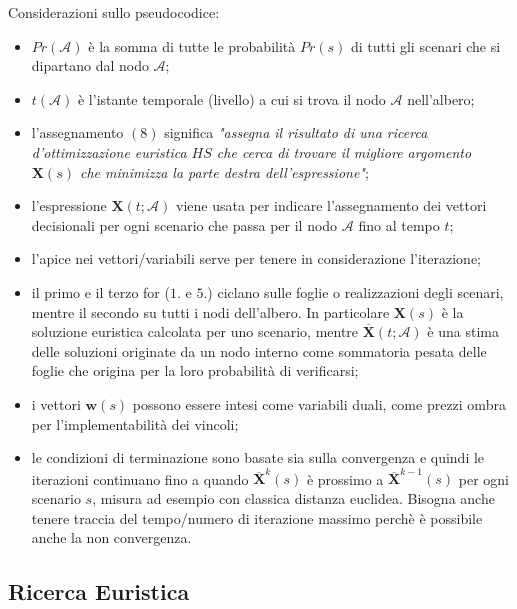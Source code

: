 \documentclass[
]{article}
\providecommand{\tightlist}{%
  \setlength{\itemsep}{0pt}\setlength{\parskip}{0pt}}
\begin{document}
Considerazioni sullo pseudocodice:
\begin{itemize}
\tightlist
\item
  {\(Pr(\mathcal{A})\)} è la somma di tutte le probabilità {\(Pr(s)\)}
  di tutti gli scenari che si dipartano dal nodo {\(\mathcal{A}\)};
\item
  {\(t(\mathcal{A})\)} è l'istante temporale (livello) a cui si trova il
  nodo {\(\mathcal{A}\)} nell'albero;
\item
  l'assegnamento {\((8)\)} significa \emph{"assegna il risultato di una
  ricerca d'ottimizzazione euristica {\(HS\)} che cerca di trovare il
  migliore argomento {\(\mathbf{X}(s)\)} che minimizza la parte destra
  dell'espressione"};
\item
  l'espressione {\(\mathbf{X}(t;\mathcal{A})\)} viene usata per indicare
  l'assegnamento dei vettori decisionali per ogni scenario che passa per
  il nodo {\(\mathcal{A}\)} fino al tempo {\(t\)};
\item
  l'apice nei vettori/variabili serve per tenere in considerazione
  l'iterazione;
\item
  il primo e il terzo for ({\(1.\)} e {\(5.\)}) ciclano sulle foglie o
  realizzazioni degli scenari, mentre il secondo su tutti i nodi
  dell'albero. In particolare {\(\mathbf{X}(s)\)} è la soluzione
  euristica calcolata per uno scenario, mentre
  {\(\overline{\mathbf{X}}(t;\mathcal{A})\)} è una stima delle soluzioni
  originate da un nodo interno come sommatoria pesata delle foglie che
  origina per la loro probabilità di verificarsi;
\item
  i vettori {\(\mathbf{w}(s)\)} possono essere intesi come variabili
  duali, come prezzi ombra per l'implementabilità dei vincoli;
\item
  le condizioni di terminazione sono basate sia sulla convergenza e
  quindi le iterazioni continuano fino a quando
  {\({\overline{\mathbf{X}}}^{k}(s)\)} è prossimo a
  {\({\overline{\mathbf{X}}}^{k - 1}(s)\)} per ogni scenario {\(s\)},
  misura ad esempio con classica distanza euclidea. Bisogna anche tenere
  traccia del tempo/numero di iterazione massimo perchè è possibile
  anche la non convergenza.
\end{itemize}

\hypertarget{ricerca-euristica}{%
\subsection{Ricerca Euristica}\label{ricerca-euristica}}
\end{document}
